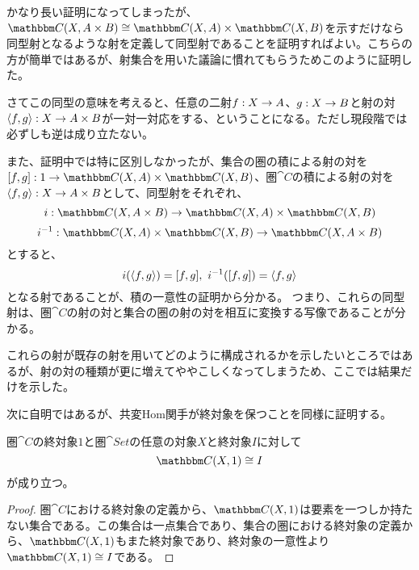 	かなり長い証明になってしまったが、$\arset{C}{X}{A\times B}\cong \arset{C}{X}{A}\times \arset{C}{X}{B}$を示すだけなら同型射となるような射を定義して同型射であることを証明すればよい。こちらの方が簡単ではあるが、射集合を用いた議論に慣れてもらうためこのように証明した。

	さてこの同型の意味を考えると、任意の二射$f:X\rightarrow A$、$g:X\rightarrow B$と射の対$\langle f,g\rangle:X\rightarrow A\times B$が一対一対応をする、ということになる。ただし現段階では必ずしも逆は成り立たない。

  また、証明中では特に区別しなかったが、集合の圏の積による射の対を$\mor{[f,g]}{1}{\arset{C}{X}{A}\times\arset{C}{X}{B}}$、圏$\cat{C}$の積による射の対を$\langle f,g\rangle:X\rightarrow A\times B$として、同型射をそれぞれ、\[\mor{i}{\arset{C}{X}{A\times B}}{\arset{C}{X}{A}\times\arset{C}{X}{B}}\]\[\mor{i^{-1}}{\arset{C}{X}{A}\times\arset{C}{X}{B}}{\arset{C}{X}{A\times B}}\]とすると、\[i(\tuple{f,g})=[f,g],\ i^{-1}([f,g])=\tuple{f,g}\]となる射であることが、積の一意性の証明から分かる。
  つまり、これらの同型射は、圏$\cat{C}$の射の対と集合の圏の射の対を相互に変換する写像であることが分かる。


  これらの射が既存の射を用いてどのように構成されるかを示したいところではあるが、射の対の種類が更に増えてややこしくなってしまうため、ここでは結果だけを示した。

	次に自明ではあるが、共変Hom関手が終対象を保つことを同様に証明する。
	\begin{prop}[Hom関手の終対象の保存]\label{prop-preservation-terminal-object-by-hom-functor}
		圏$\cat{C}$の終対象$1$と圏$\cat{Set}$の任意の対象$X$と終対象$I$に対して\[\arset{C}{X}{1}\cong I\]が成り立つ。
	\end{prop}
  \begin{proof}
    圏$\cat{C}$における終対象の定義から、$\arset{C}{X}{1}$は要素を一つしか持たない集合である。この集合は一点集合であり、集合の圏における終対象の定義から、$\arset{C}{X}{1}$もまた終対象であり、終対象の一意性より$\arset{C}{X}{1}\cong I$である。
  \end{proof}


